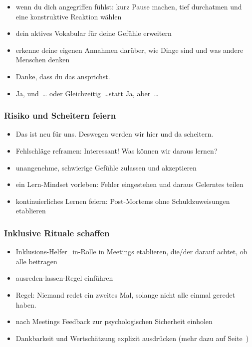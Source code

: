 \begin{itemize}
  \item wenn du dich angegriffen fühlst: kurz Pause machen, tief durchatmen und eine konstruktive Reaktion wählen
  \item dein aktives Vokabular für deine Gefühle erweitern
  \item erkenne deine eigenen Annahmen darüber, wie Dinge sind und was andere Menschen denken 
  \item \glqq Danke, dass du das ansprichst.\grqq {}
  \item \glqq Ja, und~\ldots\grqq{} oder \glqq Gleichzeitig~\ldots\grqq statt \glqq Ja, aber~\ldots\grqq {}
\end{itemize}


\subsubsection{Risiko und Scheitern feiern}

\begin{itemize}
  \item \glqq Das ist neu für uns. Deswegen werden wir hier und da scheitern.\grqq
  \item Fehlschläge reframen: \glqq Interessant! Was können wir daraus lernen?\grqq {} 
  \item unangenehme, schwierige Gefühle zulassen und akzeptieren 
  \item ein Lern-Mindset vorleben: Fehler eingestehen und daraus Gelerntes teilen 
  \item kontinuierliches Lernen feiern: Post-Mortems ohne Schuldzuweisungen etablieren  
\end{itemize}


\subsubsection{Inklusive Rituale schaffen}

\begin{itemize}
  \item \glqq Inklusions-Helfer\_in\grqq-Rolle in Meetings etablieren, die/der darauf achtet, ob alle beitragen 
  \item \glqq ausreden-lassen\grqq-Regel einführen 
  \item Regel: \glqq Niemand redet ein zweites Mal, solange nicht alle einmal geredet haben.\grqq
  \item nach Meetings Feedback zur psychologischen Sicherheit einholen
  \item Dankbarkeit und Wertschätzung explizit ausdrücken (mehr dazu auf Seite~\pageref{wertschaetzung})  
\end{itemize}


